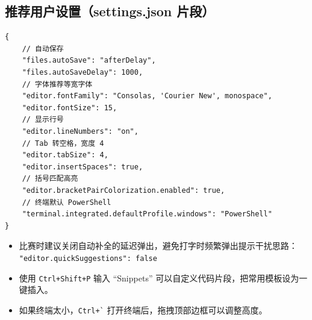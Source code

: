 \documentclass[UTF8,openany,oneside,zihao=-4]{ctexbook}
\newcommand{\inputnewboard}[1]{%
  {%
    \lstset{basicstyle=\newboardcodefont\small}%
  }%
}
\begin{document}
\subsection{推荐用户设置（settings.json 片段）}

\begin{lstlisting}
{
    // 自动保存
    "files.autoSave": "afterDelay",
    "files.autoSaveDelay": 1000,
    // 字体推荐等宽字体
    "editor.fontFamily": "Consolas, 'Courier New', monospace",
    "editor.fontSize": 15,
    // 显示行号
    "editor.lineNumbers": "on",
    // Tab 转空格，宽度 4
    "editor.tabSize": 4,
    "editor.insertSpaces": true,
    // 括号匹配高亮
    "editor.bracketPairColorization.enabled": true,
    // 终端默认 PowerShell
    "terminal.integrated.defaultProfile.windows": "PowerShell"
}
\end{lstlisting}

\begin{tip}
\begin{itemize}
  \item 比赛时建议关闭自动补全的延迟弹出，避免打字时频繁弹出提示干扰思路：\\
    \lstinline|"editor.quickSuggestions": false|
  \item 使用 \lstinline|Ctrl+Shift+P| 输入 ``Snippets'' 可以自定义代码片段，把常用模板设为一键插入。
  \item 如果终端太小，\lstinline|Ctrl+`| 打开终端后，拖拽顶部边框可以调整高度。
\end{itemize}
\end{tip}

\inputnewboard{remake/large/12_索引.tex}
\end{document}
